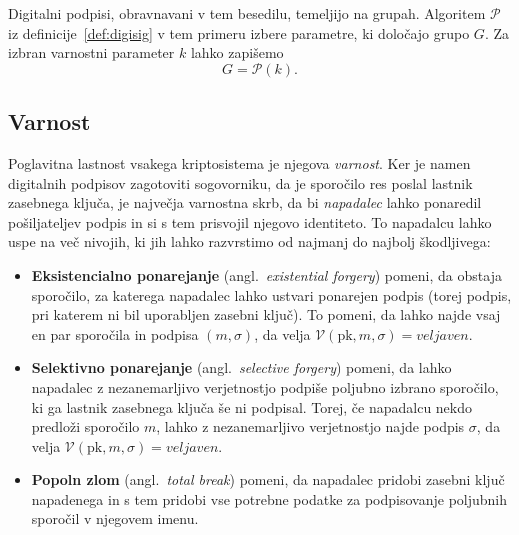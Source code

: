 \begin{primer}
    Digitalni podpisi, obravnavani v tem besedilu, temeljijo na grupah. Algoritem $\mathcal{P}$ iz
    definicije~\ref{def:digisig} v tem primeru izbere parametre, ki določajo grupo $G$. Za izbran
    varnostni parameter $k$ lahko zapišemo 
    $$
    G = \mathcal{P}(k).
    $$
\end{primer}

\subsection{Varnost}
Poglavitna lastnost vsakega kriptosistema je njegova \textit{varnost}. Ker je namen digitalnih podpisov
zagotoviti sogovorniku, da je sporočilo res poslal lastnik zasebnega ključa, je največja varnostna
skrb, da bi \textit{napadalec} lahko ponaredil pošiljateljev podpis in si s tem prisvojil njegovo
identiteto. To napadalcu lahko uspe na več nivojih, ki jih lahko razvrstimo od najmanj do najbolj
škodljivega:

\begin{itemize}
    \item \textbf{Eksistencialno ponarejanje} (angl.\ \textit{existential forgery}) pomeni, da obstaja
        sporočilo, za katerega napadalec lahko ustvari ponarejen podpis (torej podpis, pri katerem
        ni bil uporabljen zasebni ključ). To pomeni, da lahko najde vsaj en par sporočila in podpisa
        $(m, \sigma)$, da velja $\mathcal{V}(\text{pk}, m, \sigma) = veljaven$.
    \item \textbf{Selektivno ponarejanje} (angl.\ \textit{selective forgery}) pomeni, da lahko napadalec
        z nezanemarljivo verjetnostjo podpiše poljubno izbrano sporočilo, ki ga lastnik zasebnega
        ključa še ni podpisal. Torej, če napadalcu nekdo predloži sporočilo $m$, lahko z nezanemarljivo
        verjetnostjo najde podpis $\sigma$, da velja $\mathcal{V}(\text{pk}, m, \sigma) = veljaven$.
    \item \textbf{Popoln zlom} (angl.\ \textit{total break}) pomeni, da napadalec pridobi
        zasebni ključ napadenega in s tem pridobi vse potrebne podatke za podpisovanje poljubnih
        sporočil v njegovem imenu.
\end{itemize}

